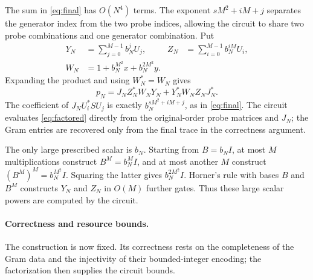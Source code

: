 \documentclass[11pt,letterpaper]{article}
\theoremstyle{definition}\newtheorem{definition}[theorem]{Definition}
\theoremstyle{remark}\newtheorem{remark}[theorem]{Remark}
\begin{document}
The sum in \eqref{eq:final} has $O(N^4)$ terms. The exponent $sM^2+iM+j$
separates the generator index from the two probe indices, allowing the
circuit to share two probe combinations and one generator combination. Put
\[
\begin{aligned}
Y_N&=\sum_{j=0}^{M-1}b_N^jU_j,&
Z_N&=\sum_{i=0}^{M-1}b_N^{iM}U_i,\\
W_N&=1+b_N^{M^2}x+b_N^{2M^2}y.
\end{aligned}
\]
Expanding the product and using $W_N^*=W_N$ gives
\begin{equation}\label{eq:factored}
p_N=J_NZ_N^*W_NY_N+Y_N^*W_NZ_NJ_N^*.
\end{equation}
The coefficient of $J_NU_i^*SU_j$ is exactly $b_N^{sM^2+iM+j}$, as in
\eqref{eq:final}. The circuit evaluates \eqref{eq:factored} directly from
the original-order probe matrices and $J_N$; the Gram entries are recovered
only from the final trace in the correctness argument.

The only large prescribed scalar is $b_N$. Starting from $B=b_NI$, at most
$M$ multiplications construct $B^M=b_N^MI$, and at most another $M$ construct
$(B^M)^M=b_N^{M^2}I$. Squaring the latter gives $b_N^{2M^2}I$.
Horner's rule with bases $B$ and $B^M$ constructs $Y_N$ and $Z_N$ in $O(M)$
further gates. Thus these large scalar powers are computed by the circuit.

\paragraph{Correctness and resource bounds.}
The construction is now fixed. Its correctness rests on the completeness of
the Gram data and the injectivity of their bounded-integer encoding; the
factorization then supplies the circuit bounds.
\end{document}
